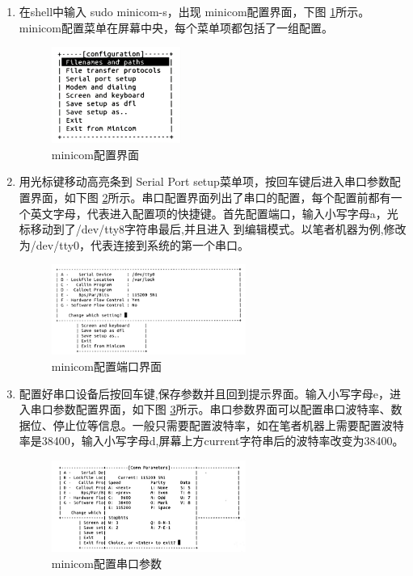 \begin{enumerate}
	\item 在shell中输入 sudo minicom-s，出现 minicom配置界面，下图 \ref{minicom配置界面}所示。minicom配置菜单在屏幕中央，每个菜单项都包括了一组配置。
	\begin{figure}[h]
		\centering
		\includegraphics[width=0.4\textwidth]{figures/08-01-minicom配置界面.png}
		\caption{minicom配置界面}
		\label{minicom配置界面}
	\end{figure}

	\item 用光标键移动高亮条到 Serial Port setup菜单项，按回车键后进入串口参数配置界面，如下图 \ref{minicom配置端口界面}所示。串口配置界面列出了串口的配置，每个配置前都有一个英文字母，代表进入配置项的快捷键。首先配置端口，输入小写字母a，光标移动到了/dev/tty8字符串最后,并且进入
	到编辑模式。以笔者机器为例,修改为/dev/tty0，代表连接到系统的第一个串口。
	\begin{figure}[h]
		\centering
		\includegraphics[width=0.6\textwidth]{figures/08-01-minicom配置端口界面.png}
		\caption{minicom配置端口界面}
		\label{minicom配置端口界面}
	\end{figure}

	\item 配置好串口设备后按回车键,保存参数并且回到提示界面。输入小写字母e，进入串口参数配置界面，如下图 \ref{minicom配置串口参数}所示。串口参数界面可以配置串口波特率、数据位、停止位等信息。一般只需要配置波特率，如在笔者机器上需要配置波特率是38400，输入小写字母d,屏幕上方current字符串后的波特率改变为38400。
	\begin{figure}[h]
		\centering
		\includegraphics[width=0.6\textwidth]{figures/08-01-minicom配置串口参数.png}
		\caption{minicom配置串口参数}
		\label{minicom配置串口参数}
	\end{figure}


\end{enumerate}

